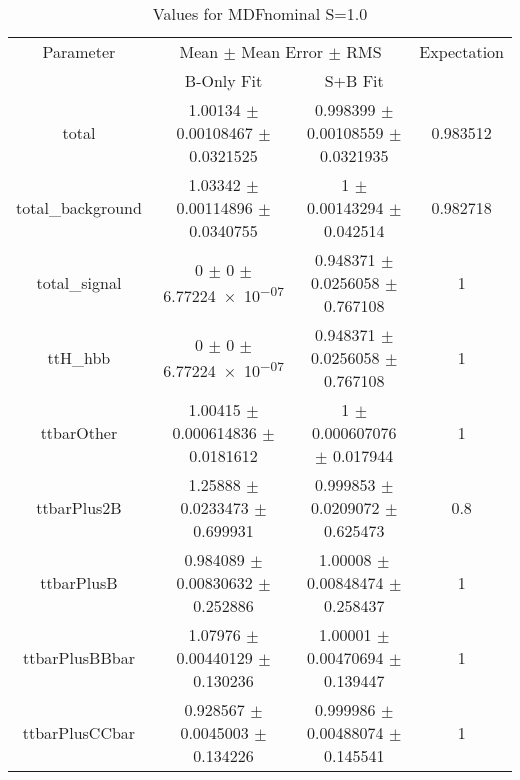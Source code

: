 \begin{table}
\centering
\caption{Values for MDFnominal S=1.0}
\begin{tabular}{cccc}
\toprule
Parameter & \multicolumn{2}{c}{Mean $\pm$ Mean Error $\pm$ RMS} & Expectation\\
 & B-Only Fit & S+B Fit & \\
\midrule
total & \num{1.00134} $\pm$ \num{0.00108467} $\pm$ \num{0.0321525} & \num{0.998399} $\pm$ \num{0.00108559} $\pm$ \num{0.0321935} & \num{0.983512}\\
total\_background & \num{1.03342} $\pm$ \num{0.00114896} $\pm$ \num{0.0340755} & \num{1} $\pm$ \num{0.00143294} $\pm$ \num{0.042514} & \num{0.982718}\\
total\_signal & \num{0} $\pm$ \num{0} $\pm$ \num{6.77224e-07} & \num{0.948371} $\pm$ \num{0.0256058} $\pm$ \num{0.767108} & \num{1}\\
ttH\_hbb & \num{0} $\pm$ \num{0} $\pm$ \num{6.77224e-07} & \num{0.948371} $\pm$ \num{0.0256058} $\pm$ \num{0.767108} & \num{1}\\
ttbarOther & \num{1.00415} $\pm$ \num{0.000614836} $\pm$ \num{0.0181612} & \num{1} $\pm$ \num{0.000607076} $\pm$ \num{0.017944} & \num{1}\\
ttbarPlus2B & \num{1.25888} $\pm$ \num{0.0233473} $\pm$ \num{0.699931} & \num{0.999853} $\pm$ \num{0.0209072} $\pm$ \num{0.625473} & \num{0.8}\\
ttbarPlusB & \num{0.984089} $\pm$ \num{0.00830632} $\pm$ \num{0.252886} & \num{1.00008} $\pm$ \num{0.00848474} $\pm$ \num{0.258437} & \num{1}\\
ttbarPlusBBbar & \num{1.07976} $\pm$ \num{0.00440129} $\pm$ \num{0.130236} & \num{1.00001} $\pm$ \num{0.00470694} $\pm$ \num{0.139447} & \num{1}\\
ttbarPlusCCbar & \num{0.928567} $\pm$ \num{0.0045003} $\pm$ \num{0.134226} & \num{0.999986} $\pm$ \num{0.00488074} $\pm$ \num{0.145541} & \num{1}\\
\bottomrule
\end{tabular}
\end{table}